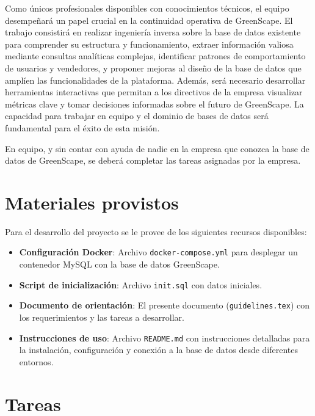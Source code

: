 \documentclass[10pt]{article}
\begin{document}
	Como únicos profesionales disponibles con conocimientos técnicos, el equipo desempeñará un papel crucial en la continuidad operativa de GreenScape. El trabajo consistirá en realizar ingeniería inversa sobre la base de datos existente para comprender su estructura y funcionamiento, extraer información valiosa mediante consultas analíticas complejas, identificar patrones de comportamiento de usuarios y vendedores, y proponer mejoras al diseño de la base de datos que amplíen las funcionalidades de la plataforma. Además, será necesario desarrollar herramientas interactivas que permitan a los directivos de la empresa visualizar métricas clave y tomar decisiones informadas sobre el futuro de GreenScape. La capacidad para trabajar en equipo y el dominio de bases de datos será fundamental para el éxito de esta misión.
	
	En equipo, y sin contar con ayuda de nadie en la empresa que conozca la base de datos de GreenScape, se deberá completar las tareas asignadas por la empresa.
	
	\section*{Materiales provistos}
	
	Para el desarrollo del proyecto se le provee de los siguientes recursos disponibles:
	
	\begin{itemize}
		\item \textbf{Configuración Docker}: Archivo \texttt{docker-compose.yml} para desplegar un contenedor MySQL con la base de datos GreenScape. 
		
		\item \textbf{Script de inicialización}: Archivo \texttt{init.sql} con datos iniciales.
		
		\item \textbf{Documento de orientación}: El presente documento (\texttt{guidelines.tex}) con los requerimientos y las tareas a desarrollar.
		
		\item \textbf{Instrucciones de uso}: Archivo \texttt{README.md} con instrucciones detalladas para la instalación, configuración y conexión a la base de datos desde diferentes entornos.
	\end{itemize}
	
	\section*{Tareas}
	
\end{document}

